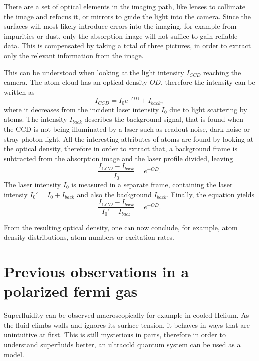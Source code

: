 
There are a set of optical elements in the imaging path, like lenses to collimate the image and refocus it, or mirrors to guide the light into the camera. Since the surfaces will most likely introduce errors into the imaging, for example from impurities or dust, only the absorption image will not suffice to gain reliable data. This is compensated by taking a total of three pictures, in order to extract only the relevant information from the image.

This can be understood when looking at the light intensity $I_{CCD}$ reaching the camera. The atom cloud has an optical density $OD$, therefore the intensity can be written as
\begin{equation}
I_{CCD} = I_0 e^{-OD} + I_{back},
\end{equation}
where it decreases from the incident laser intensity $I_0$ due to light scattering by atoms. The intensity $I_{back}$ describes the background signal, that is found when the CCD is not being illuminated by a laser such as readout noise, dark noise or stray photon light. All the interesting attributes of atoms are found by looking at the optical density, therefore in order to extract that, a background frame is subtracted from the absorption image and the laser profile divided, leaving
\begin{equation}
\frac{I_{CCD} - I_{back}}{I_0} = e^{-OD}.
\end{equation}
The laser intensity $I_0$ is measured in a separate frame, containing the laser intensiy $I_0' = I_0 + I_{back}$ and also the background $I_{back}$. Finally, the equation yields
\begin{equation}
\frac{I_{CCD} - I_{back}}{I_0' - I_{back}} = e^{-OD}.
\end{equation}

From the resulting optical density, one can now conclude, for example, atom density distributions, atom numbers or excitation rates.

\section{Previous observations in a polarized fermi gas}

Superfluidity can be observed macroscopically for example in cooled Helium. As the fluid climbs walls and ignores its surface tension, it behaves in ways that are unintuitive at first. This is still mysterious in parts, therefore in order to understand superfluids better, an ultracold quantum system can be used as a model.


